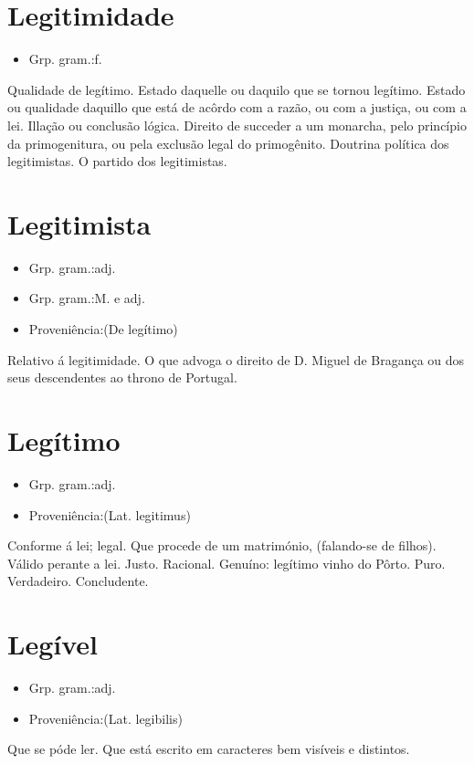 \section{Legitimidade}
\begin{itemize}
\item {Grp. gram.:f.}
\end{itemize}
Qualidade de legítimo.
Estado daquelle ou daquilo que se tornou legítimo.
Estado ou qualidade daquillo que está de acôrdo com a razão, ou com a justiça, ou com a lei.
Illação ou conclusão lógica.
Direito de succeder a um monarcha, pelo princípio da primogenitura, ou pela exclusão legal do primogênito.
Doutrina política dos legitimistas.
O partido dos legitimistas.
\section{Legitimista}
\begin{itemize}
\item {Grp. gram.:adj.}
\end{itemize}
\begin{itemize}
\item {Grp. gram.:M.  e  adj.}
\end{itemize}
\begin{itemize}
\item {Proveniência:(De \textunderscore legítimo\textunderscore )}
\end{itemize}
Relativo á legitimidade.
O que advoga o direito de D. Miguel de Bragança ou dos seus descendentes ao throno de Portugal.
\section{Legítimo}
\begin{itemize}
\item {Grp. gram.:adj.}
\end{itemize}
\begin{itemize}
\item {Proveniência:(Lat. \textunderscore legitimus\textunderscore )}
\end{itemize}
Conforme á lei; legal.
Que procede de um matrimónio, (falando-se de filhos).
Válido perante a lei.
Justo.
Racional.
Genuíno: \textunderscore legítimo vinho do Pôrto\textunderscore .
Puro.
Verdadeiro.
Concludente.
\section{Legível}
\begin{itemize}
\item {Grp. gram.:adj.}
\end{itemize}
\begin{itemize}
\item {Proveniência:(Lat. \textunderscore legibilis\textunderscore )}
\end{itemize}
Que se póde ler.
Que está escrito em caracteres bem visíveis e distintos.
